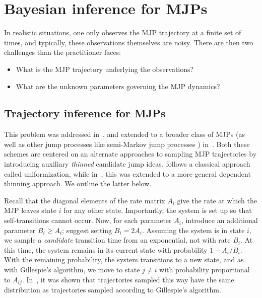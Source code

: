 
\section{Bayesian inference for MJPs}
In realistic situations, one only observes the MJP trajectory at
a finite set of times, and typically, these observations themselves
are noisy. There are then two challenges than the practitioner
faces:
\begin{itemize}
  \item What is the MJP trajectory underlying the observations?
  \item What are the unknown parameters governing the MJP dynamics?
\end{itemize}

\subsection{Trajectory inference for MJPs}
This problem was addressed in~\cite{RaoTeh13}, and extended to a broader 
class of MJPs (as well as other jump processes like semi-Markov jump processes
) in~\cite{RaoTeh12}. Both these schemes are centered on an alternate
approaches to sampling MJP trajectories by introducing auxiliary
{\em thinned} candidate jump ideas. \cite{RaoTeh13} follows a classical
approach called uniformization, while in~\cite{RaoTeh12}, this was
extended to a more general dependent thinning approach. We outline
the latter below.

Recall that the diagonal elements of the rate matrix $A_i$ give the 
rate at which the MJP leaves state $i$ for any other state. Importantly,
the system is set up so that self-transitions cannot occur. Now,
for each parameter $A_i$, introduce an additional parameter $B_i \ge A_i$;
\cite{RaoTeh12} suggest setting $B_i = 2 A_i$. Assuming the system is
in state $i$, we sample a {\em candidate} transition time from an
exponential, not with rate $B_i$. At this time, the system remains in 
its current state with probability $1-A_i/B_i$. With the remaining 
probability, the system transitions to a new state, and as with
Gillespie's algorithm, we move to state $j \neq i$ with probability
proportional to $A_{ij}$. In~\cite{RaoTeh12}, it was shown that
trajectories sampled this way have the same distribution as trajectories
sampled according to Gillespie's algorithm.

